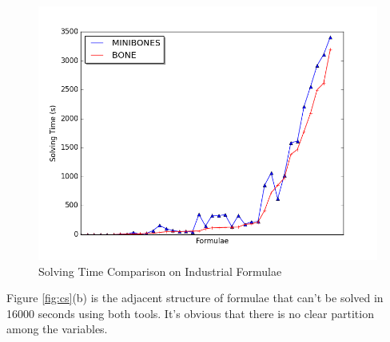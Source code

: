 \begin{figure}
    \centering
    \includegraphics[scale=0.5]{ind.png}
   \caption{Solving Time Comparison on Industrial Formulae}
   \label{fig:ind}
\end{figure}

Figure \ref{fig:cs}(b) is the adjacent structure of formulae that can't be solved in 16000 seconds using both tools. It's obvious that there is no clear partition among the variables.


